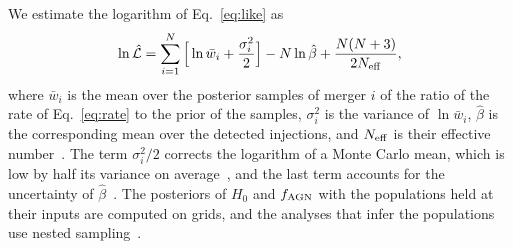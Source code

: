 \documentclass[aps,prd,reprint,amsmath,amssymb,nofootinbib]{revtex4-2}
\newcommand{\fAGN}{f_{\rm AGN}}
\begin{document}
We estimate the logarithm of Eq.~\eqref{eq:like} as
\begin{equation}
\ln\hat{\mathcal{L}}=\sum_{i=1}^{N}\Big[\ln\bar w_i+\frac{\sigma_i^2}{2}\Big]-N\ln\hat\beta+\frac{N(N+3)}{2N_{\rm eff}},
\label{eq:estimator}
\end{equation}
where $\bar w_i$ is the mean over the posterior samples of merger $i$ of the ratio of the rate of Eq.~\eqref{eq:rate} to the prior of the samples, $\sigma_i^2$ is the variance of $\ln\bar w_i$, $\hat\beta$ is the corresponding mean over the detected injections, and $N_{\rm eff}$ is their effective number~\cite{Farr:2019rap}.
The term $\sigma_i^2/2$ corrects the logarithm of a Monte Carlo mean, which is low by half its variance on average~\cite{Essick:2022ojx,Talbot:2023pex}, and the last term accounts for the uncertainty of $\hat\beta$~\cite{Farr:2019rap}.
The posteriors of $H_0$ and $\fAGN$ with the populations held at their inputs are computed on grids, and the analyses that infer the populations use nested sampling~\cite{Speagle:2019ivv}.


\end{document}
